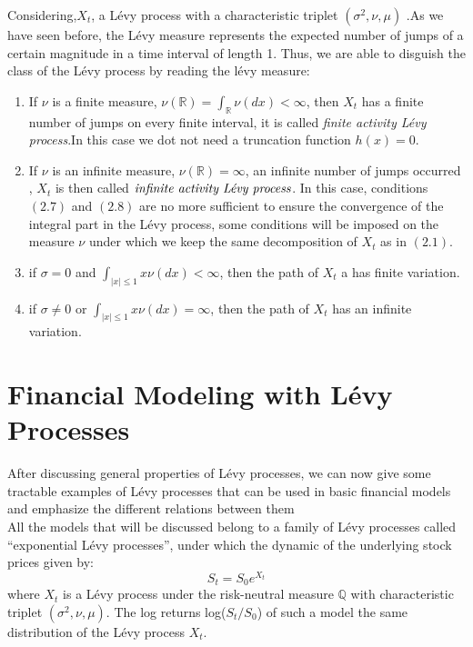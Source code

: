 \documentclass[12pt]{report}
\begin{document}
Considering,$X_t$, a Lévy process with a characteristic triplet $(\sigma^2,\nu, \mu)$ .As we have seen before, the Lévy measure represents the expected number of
jumps of a certain magnitude in a time interval of length 1. Thus, we are able to disguish the class of the Lévy process by reading the lévy measure:
\begin{enumerate}

\item If $\nu$ is a finite
measure,  $\nu(\mathbb{R})= \int_{\mathbb{R}} \nu(dx) < \infty$, then $X_t$ has a finite number of jumps on every finite interval, it is called \emph{finite activity Lévy process}.In this case we dot not need a truncation function $h(x)=0 $.

\item If $\nu$ is an infinite
measure, $\nu(\mathbb{R})=\infty $, an infinite number of jumps  occurred , $X_t$ is then called $\emph{infinite activity Lévy process}$. In this case, conditions $(2.7)$ and $(2.8)$ are no more sufficient to ensure the convergence of the integral part in the Lévy process, some conditions will be imposed on the measure $\nu$ under which we keep the same decomposition of $X_t$ as in $(2.1)$. 

\item if $\sigma = 0$ and $\int_{\mid x\mid
\leqslant1} x\nu(dx) < \infty $, then the path of $X_t$ a has finite variation.
\item if $\sigma \neq 0$ or $\int_{\mid
x\mid
\leqslant
1} x\nu(dx) = \infty $, then the
path of $X_t$ has an infinite variation.
\end{enumerate}
\chapter{ Financial Modeling with Lévy Processes }

After discussing general properties of Lévy processes, we can now give some tractable examples of Lévy processes that can be used in basic financial models and emphasize the different relations between them\\
All the models that will be discussed belong to a family of Lévy processes called “exponential Lévy processes”, under which the dynamic of the underlying stock prices  given by: 
\begin{equation}
S_t= S_0e^{X_t}
\end{equation}
where $X_t$ is a Lévy process under the risk-neutral measure  $\mathbb{Q}$ with
characteristic triplet $(\sigma^2,\nu, \mu)$.
 The log returns log($S_{t}/S_0$) of such a model
 the same distribution of the Lévy process $X_t$.
\end{document}
